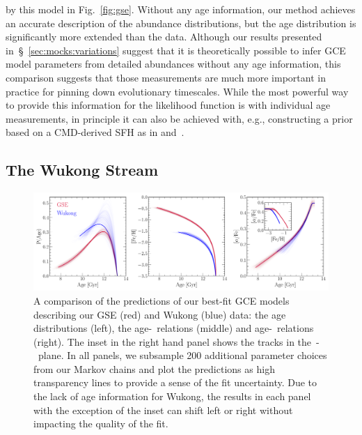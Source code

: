 \documentclass[ms.tex]{subfiles}
\begin{document}
by this model in Fig.~\ref{fig:gse}.
Without any age information, our method achieves an accurate description of the
abundance distributions, but the age distribution is significantly more
extended than the data.
Although our results presented in~\S~\ref{sec:mocks:variations} suggest that it
is theoretically possible to infer GCE model parameters from detailed
abundances without any age information, this comparison suggests that those
measurements are much more important in practice for pinning down evolutionary
timescales.
While the most powerful way to provide this information for the likelihood
function is with individual age measurements, in principle it can also be
achieved with, e.g., constructing a prior based on a CMD-derived SFH as in
\citet{Dolphin2002} and~\citet{Weisz2014b}.

\subsection{The Wukong Stream}
\label{sec:h3:wukong}

\begin{figure}
\centering
\includegraphics[scale = 0.45]{gse_wukong_comparison.pdf}
\caption{
A comparison of the predictions of our best-fit GCE models describing our
GSE (red) and Wukong (blue) data: the age distributions (left), the
age-\feh~relations (middle) and age-\afe~relations (right).
The inset in the right hand panel shows the tracks in the~\afe-\feh~plane.
In all panels, we subsample 200 additional parameter choices from our Markov
chains and plot the predictions as high transparency lines to provide a sense
of the fit uncertainty.
Due to the lack of age information for Wukong, the results in each panel with
the exception of the inset can shift left or right without impacting the
quality of the fit.
}
\label{fig:comparison}
\end{figure}
\end{document}
